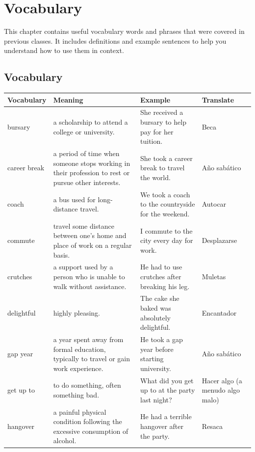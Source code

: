 
\chapter{Vocabulary}

This chapter contains useful vocabulary words and phrases that were covered in previous classes. It includes definitions and example sentences to help you understand how to use them in context.

\section{Vocabulary}

\begin{longtable}{p{}p{}p{}p{}}
\textbf{Vocabulary} & \textbf{Meaning} & \textbf{Example} & \textbf{Translate} \\
\hline
\endhead
bursary & a scholarship to attend a college or university. & She received a bursary to help pay for her tuition. & Beca\\
\hline
career break & a period of time when someone stops working in their profession to rest or pursue other interests. & She took a career break to travel the world. & Año sabático\\
\hline
coach & a bus used for long-distance travel. & We took a coach to the countryside for the weekend. & Autocar\\
\hline
commute & travel some distance between one's home and place of work on a regular basis. & I commute to the city every day for work. & Desplazarse\\
\hline
crutches & a support used by a person who is unable to walk without assistance. & He had to use crutches after breaking his leg. & Muletas\\
\hline
delightful & highly pleasing. & The cake she baked was absolutely delightful. & Encantador\\
\hline
gap year & a year spent away from formal education, typically to travel or gain work experience. & He took a gap year before starting university. & Año sabático\\
\hline
get up to & to do something, often something bad. & What did you get up to at the party last night? & Hacer algo (a menudo algo malo)\\
\hline
hangover & a painful physical condition following the excessive consumption of alcohol. & He had a terrible hangover after the party. & Resaca\\
\hline

\end{longtable}
